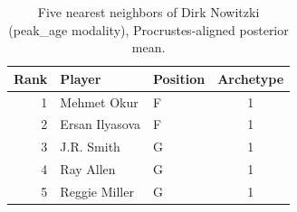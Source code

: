 \begin{table}[htbp]
  \centering\small
  \begin{tabular}{rllc}
    \toprule
    Rank & Player & Position & Archetype \\
    \midrule
    1 & Mehmet Okur & F & 1 \\
    2 & Ersan Ilyasova & F & 1 \\
    3 & J.R. Smith & G & 1 \\
    4 & Ray Allen & G & 1 \\
    5 & Reggie Miller & G & 1 \\
    \bottomrule
  \end{tabular}
  \caption{Five nearest neighbors of Dirk Nowitzki (peak_age modality), Procrustes-aligned posterior mean.}
  \label{tab:Dirk_Nowitzki_neighbors_peak_age}
\end{table}

